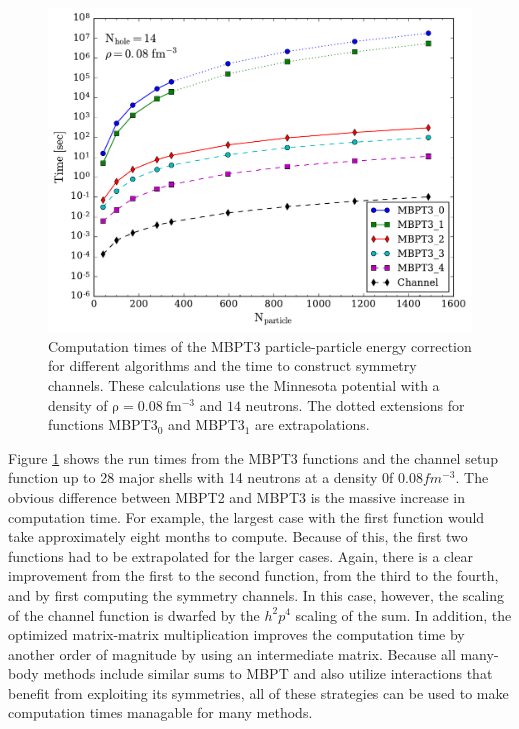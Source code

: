 \begin{figure}
  \includegraphics[width=\linewidth]{Chapter8-figures/MBPT3fig.pdf}
  \caption{Computation times of the MBPT3 particle-particle energy correction for different algorithms and the time to construct symmetry channels. These calculations use the Minnesota potential with a density of $\mathrm{\rho=0.08\ fm^{-3}}$ and $\mathrm{14}$ neutrons. The dotted extensions for functions MBPT3$_0$ and MBPT3$_1$ are extrapolations.}
  \label{fig:fig6}
\end{figure}

Figure \ref{fig:fig6} shows the run times from the MBPT3 functions and
the channel setup function up to 28 major shells with 14 neutrons at a
density 0f $0.08 fm^{-3}$. The obvious difference between MBPT2 and
MBPT3 is the massive increase in computation time. For example, the
largest case with the first function would take approximately eight
months to compute. Because of this, the first two functions had to be
extrapolated for the larger cases. Again, there is a clear improvement
from the first to the second function, from the third to the fourth,
and by first computing the symmetry channels. In this case, however,
the scaling of the channel function is dwarfed by the $h^2p^4$ scaling
of the sum. In addition, the optimized matrix-matrix multiplication
improves the computation time by another order of magnitude by using
an intermediate matrix. Because all many-body methods include similar
sums to MBPT and also utilize interactions that benefit from
exploiting its symmetries, all of these strategies can be used to make
computation times managable for many methods.

